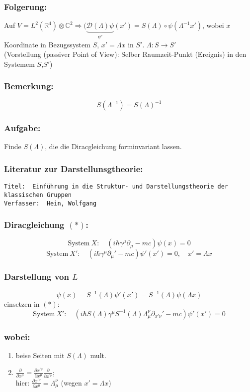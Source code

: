 \documentclass[twoside,a4paper]{scrartcl}
\newcommand{\R}{\mathbb{R}}
\newcommand{\C}{\mathbb{C}}
\newcommand{\D}{\mathcal{D}}
\renewcommand{\1}{\mathds{1}}
\newcommand{\Ra}{\Rightarrow}
\newcommand{\ra}{\rightarrow}
\renewcommand{\L}{\Lambda}
\renewcommand{\R}{\mathbb{R}}
\renewcommand{\C}{\mathbb{C}}
\begin{document}
\subsubsection*{Folgerung:}
Auf $V=L^2(\R^4)\otimes \C^2 \Ra (\underbrace{\D(\L)\psi}_{\psi'}(x')=S(\L)\circ \psi(\L^{-1}x')$, wobei $x$ Koordinate in Bezugssystem $S$, $x'=\L x$ in $S'$. $\L:S \ra S'$\\
(Vorstellung (passiver Point of View): Selber Raumzeit-Punkt (Ereignis) in den Systemem $S$,$S'$)
\subsubsection*{Bemerkung:}
$$S(\L^{-1})=S(\L)^{-1}$$
\subsubsection*{Aufgabe:}
Finde $S(\L)$, die die Diracgleichung forminvariant lassen.
\subsubsection*{Literatur zur Darstellunsgtheorie:}

\begin{tiny}
\begin{verbatim}
Titel: 	Einführung in die Struktur- und Darstellungstheorie der klassischen Gruppen
Verfasser: 	Hein, Wolfgang
\end{verbatim}
\end{tiny}

\subsubsection*{Diracgleichung $(*)$:}
$$\mathrm{System} \ X: \quad (i\hbar \gamma^\mu \partial_\mu-mc)\psi(x)=0$$
$$\mathrm{System} \ X': \quad (i\hbar \gamma^\mu \partial_\mu'-mc)\psi'(x')=0, \quad x'=\L x$$
\subsubsection*{Darstellung von $L$}
$$\psi(x)=S^{-1}(\L) \psi'(x')=S^{-1}(\L)\psi(\L x)$$
einsetzen in $(*)$:
$$\mathrm{System} \ X': \quad (i\hbar S(\L)\gamma^\mu S^{-1}(\L) \L_\mu^\nu \partial_{x'\nu}'-mc)\psi'(x')=0$$
\subsubsection*{wobei:}
\begin{enumerate}
\item beise Seiten mit $S(\L)$ mult.
\item $\frac{\partial}{\partial x^\mu}=\frac{\partial x^{'\nu}}{\partial x^\mu}\frac{\partial}{\partial x^{'\nu}}$;\\
hier: $\frac{\partial x^{'\nu}}{\partial x^\mu}=\L_\mu^\nu$ (wegen $x'=\L x$)
\end{enumerate}
\end{document}
